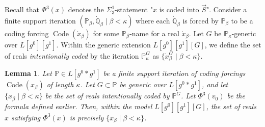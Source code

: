 \documentclass[a4paper,11pt]{article}
\newtheorem{lemma}[theorem]{Lemma}
\newcommand{\forceP}{\mathbb{P}}
\newcommand{\forceQ}{\mathbb{Q}}
\begin{document}
Recall that $\Phi^3(x)$ denotes the $\Sigma^1_3$-statement "$x$ is coded into $\vec{S}$". Consider a finite support iteration $(\forceP_{\beta}, \dot{\forceQ}_{\beta} \mid \beta < \kappa)$ where each $\dot{\forceQ}_{\beta}$ is forced by $\forceP_{\beta}$ to be a coding forcing $\operatorname{Code}(\dot{x}_{\beta})$ for some $\forceP_{\beta}$-name for a real $\dot{x}_{\beta}$. Let $G$ be $\forceP_{\kappa}$-generic over $L[g^0][g^1]$. Within the generic extension $L[g^0][g^{1}][G]$, we define the set of reals \emph{intentionally coded} by the iteration $\forceP_{\kappa}^G$ as $\{\dot{x}_{\beta}^G \mid \beta < \kappa\}$.

\begin{lemma}\label{nounwantedcodes}
Let $\forceP \in L[g^0 \ast g^1]$ be a finite support iteration of coding forcings $\operatorname{Code}(x_\beta)$ of length $\kappa$. Let $G \subset \forceP$ be generic over $L[g^0 \ast g^1]$, and let $\{ x_{\beta} \mid \beta < \kappa\}$ be the set of reals intentionally coded by $\forceP^G$. Let $\Phi^3(v_0)$ be the formula defined earlier. Then, within the model $L[g^0][g^1][G]$, the set of reals $x$ satisfying $\Phi^3(x)$ is precisely $\{ x_{\beta} \mid \beta < \kappa\}$.
\end{lemma}
\end{document}
